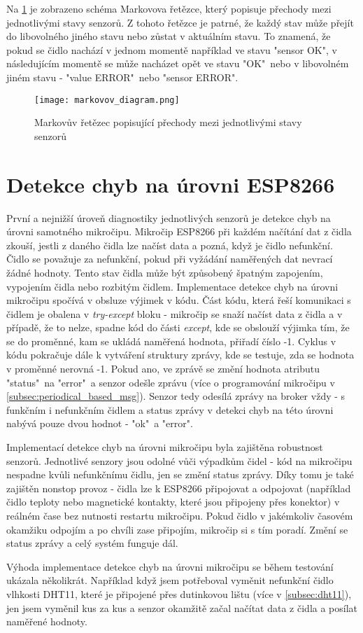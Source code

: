Na \cref{fig:markovov_diagram} je zobrazeno schéma Markovova řetězce, který popisuje přechody mezi jednotlivými stavy senzorů. Z tohoto řetězce je patrné, že každý stav může přejít do libovolného jiného stavu nebo zůstat v aktuálním stavu. To znamená, že pokud se čidlo nachází v jednom momentě například ve stavu "sensor OK", v následujícím momentě se může nacházet opět ve stavu "OK"\ nebo v libovolném jiném stavu - "value ERROR"\ nebo "sensor ERROR".

\begin{figure}[H]
  \centering
  \texttt{[image: markovov\_diagram.png]}
  \caption{Markovův řetězec popisující přechody mezi jednotlivými stavy senzorů}
  \label{fig:markovov_diagram}
\end{figure}  

\section{Detekce chyb na úrovni ESP8266} \label{sec:error_detection_esp}
První a nejnižší úroveň diagnostiky jednotlivých senzorů je detekce chyb na úrovni samotného mikročipu. Mikročip ESP8266 při každém načítání dat z čidla zkouší, jestli z daného čidla lze načíst data a pozná, když je čidlo nefunkční. Čidlo se považuje za nefunkční, pokud při vyžádání naměřených dat nevrací žádné hodnoty. Tento stav čidla může být způsobený špatným zapojením, vypojením čidla nebo rozbitým čidlem. Implementace detekce chyb na úrovni mikročipu spočívá v obsluze výjimek v kódu. Část kódu, která řeší komunikaci s čidlem je obalena v \textit{try-except} bloku - mikročip se snaží načíst data z čidla a v případě, že to nelze, spadne kód do části \textit{except}, kde se obslouží výjimka tím, že se do proměnné, kam se ukládá naměřená hodnota, přiřadí číslo -1. Cyklus v kódu pokračuje dále k vytváření struktury zprávy, kde se testuje, zda se hodnota v proměnné nerovná -1. Pokud ano, ve zprávě se změní hodnota atributu "status"\ na "error"\ a senzor odešle zprávu (více o programování mikročipu v \cref{subsec:periodical_based_msg}). Senzor tedy odesílá zprávy na broker vždy - s funkčním i nefunkčním čidlem a status zprávy v detekci chyb na této úrovni nabývá pouze dvou hodnot - "ok"\ a "error". \par
Implementací detekce chyb na úrovni mikročipu byla zajištěna robustnost senzorů. Jednotlivé senzory jsou odolné vůči výpadkům čidel - kód na mikročipu nespadne kvůli nefunkčnímu čidlu, jen se změní status zprávy. Díky tomu je také zajištěn nonstop provoz - čidla lze k ESP8266 připojovat a odpojovat (například čidlo teploty nebo magnetické kontakty, které jsou připojeny přes konektor) v reálném čase bez nutnosti restartu mikročipu. Pokud čidlo v jakémkoliv časovém okamžiku odpojím a po chvíli zase připojím, mikročip si s tím poradí. Změní se status zprávy a celý systém funguje dál. \par
Výhoda implementace detekce chyb na úrovni mikročipu se během testování ukázala několikrát. Například když jsem potřeboval vyměnit nefunkční čidlo vlhkosti DHT11, které je připojené přes dutinkovou lištu (více v \cref{subsec:dht11}), jen jsem vyměnil kus za kus a senzor okamžitě začal načítat data z čidla a posílat naměřené hodnoty.

